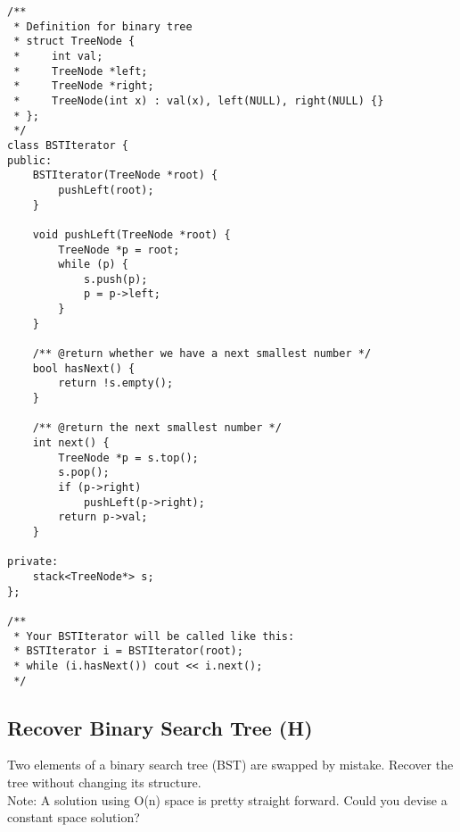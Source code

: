 \begin{lstlisting}
/**
 * Definition for binary tree
 * struct TreeNode {
 *     int val;
 *     TreeNode *left;
 *     TreeNode *right;
 *     TreeNode(int x) : val(x), left(NULL), right(NULL) {}
 * };
 */
class BSTIterator {
public:
    BSTIterator(TreeNode *root) {
        pushLeft(root);
    }
    
    void pushLeft(TreeNode *root) {
        TreeNode *p = root;
        while (p) {
            s.push(p);
            p = p->left;
        }
    }

    /** @return whether we have a next smallest number */
    bool hasNext() {
        return !s.empty();
    }

    /** @return the next smallest number */
    int next() {
        TreeNode *p = s.top();
        s.pop();
        if (p->right)
            pushLeft(p->right);
        return p->val;
    }
    
private:
    stack<TreeNode*> s;
};

/**
 * Your BSTIterator will be called like this:
 * BSTIterator i = BSTIterator(root);
 * while (i.hasNext()) cout << i.next();
 */
\end{lstlisting}


\subsection{Recover Binary Search Tree (H)}
Two elements of a binary search tree (BST) are swapped by mistake. Recover the tree without changing its structure.\\

Note: A solution using O(n) space is pretty straight forward. Could you devise a constant space solution? \\

